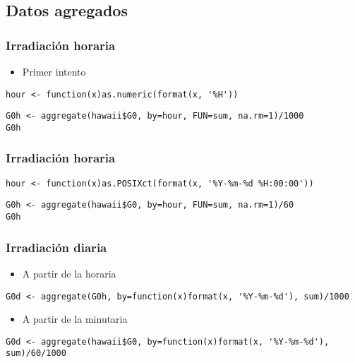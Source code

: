 \documentclass[bigger]{beamer}
\begin{document}
\subsection{Datos agregados}
\label{sec-3-2}
\begin{frame}[fragile]
\frametitle{Irradiación horaria}
\label{sec-3-2-1}

\begin{itemize}
\item Primer intento
\end{itemize}

\lstset{language=R}
\begin{lstlisting}
hour <- function(x)as.numeric(format(x, '%H'))
\end{lstlisting}


\lstset{language=R}
\begin{lstlisting}
G0h <- aggregate(hawaii$G0, by=hour, FUN=sum, na.rm=1)/1000
G0h
\end{lstlisting}
\end{frame}
\begin{frame}[fragile]
\frametitle{Irradiación horaria}
\label{sec-3-2-2}



\lstset{language=R}
\begin{lstlisting}
hour <- function(x)as.POSIXct(format(x, '%Y-%m-%d %H:00:00'))
\end{lstlisting}


\lstset{language=R}
\begin{lstlisting}
G0h <- aggregate(hawaii$G0, by=hour, FUN=sum, na.rm=1)/60
G0h
\end{lstlisting}
\end{frame}
\begin{frame}[fragile]
\frametitle{Irradiación diaria}
\label{sec-3-2-3}

\begin{itemize}
\item A partir de la horaria
\end{itemize}

\lstset{language=R}
\begin{lstlisting}
G0d <- aggregate(G0h, by=function(x)format(x, '%Y-%m-%d'), sum)/1000
\end{lstlisting}
\begin{itemize}
\item A partir de la minutaria
\end{itemize}

\lstset{language=R}
\begin{lstlisting}
G0d <- aggregate(hawaii$G0, by=function(x)format(x, '%Y-%m-%d'), sum)/60/1000
\end{lstlisting}
\end{frame}
\end{document}
